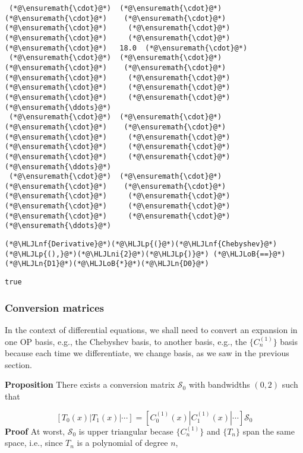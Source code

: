 \documentclass[12pt,landscape]{article}
\newcommand{\HLJLn}[1]{#1}
\newcommand{\HLJLnf}[1]{\textcolor[RGB]{66,102,213}{#1}}
\newcommand{\HLJLni}[1]{\textcolor[RGB]{59,151,46}{#1}}
\newcommand{\HLJLoB}[1]{\textcolor[RGB]{102,102,102}{\textbf{#1}}}
\newcommand{\HLJLp}[1]{#1}
\begin{document}
{\begin{lstlisting}
 (*@\ensuremath{\cdot}@*)  (*@\ensuremath{\cdot}@*)   (*@\ensuremath{\cdot}@*)    (*@\ensuremath{\cdot}@*)    (*@\ensuremath{\cdot}@*)     (*@\ensuremath{\cdot}@*)     (*@\ensuremath{\cdot}@*)     (*@\ensuremath{\cdot}@*)     (*@\ensuremath{\cdot}@*)   18.0  (*@\ensuremath{\cdot}@*)
 (*@\ensuremath{\cdot}@*)  (*@\ensuremath{\cdot}@*)   (*@\ensuremath{\cdot}@*)    (*@\ensuremath{\cdot}@*)    (*@\ensuremath{\cdot}@*)     (*@\ensuremath{\cdot}@*)     (*@\ensuremath{\cdot}@*)     (*@\ensuremath{\cdot}@*)     (*@\ensuremath{\cdot}@*)     (*@\ensuremath{\cdot}@*)   (*@\ensuremath{\ddots}@*)
 (*@\ensuremath{\cdot}@*)  (*@\ensuremath{\cdot}@*)   (*@\ensuremath{\cdot}@*)    (*@\ensuremath{\cdot}@*)    (*@\ensuremath{\cdot}@*)     (*@\ensuremath{\cdot}@*)     (*@\ensuremath{\cdot}@*)     (*@\ensuremath{\cdot}@*)     (*@\ensuremath{\cdot}@*)     (*@\ensuremath{\cdot}@*)   (*@\ensuremath{\ddots}@*)
 (*@\ensuremath{\cdot}@*)  (*@\ensuremath{\cdot}@*)   (*@\ensuremath{\cdot}@*)    (*@\ensuremath{\cdot}@*)    (*@\ensuremath{\cdot}@*)     (*@\ensuremath{\cdot}@*)     (*@\ensuremath{\cdot}@*)     (*@\ensuremath{\cdot}@*)     (*@\ensuremath{\cdot}@*)     (*@\ensuremath{\cdot}@*)   (*@\ensuremath{\ddots}@*)
\end{lstlisting}


\begin{lstlisting}
(*@\HLJLnf{Derivative}@*)(*@\HLJLp{(}@*)(*@\HLJLnf{Chebyshev}@*)(*@\HLJLp{(),}@*)(*@\HLJLni{2}@*)(*@\HLJLp{)}@*) (*@\HLJLoB{==}@*) (*@\HLJLn{D1}@*)(*@\HLJLoB{*}@*)(*@\HLJLn{D0}@*)
\end{lstlisting}

\begin{lstlisting}
true
\end{lstlisting}


\subsubsection{Conversion matrices}
In the context of differential equations, we shall need to convert an expansion in one OP basis, e.g., the Chebyshev basis, to another basis, e.g., the $\{ C_n^{(1)}\}$ basis because each time we differentiate, we change basis, as we saw in the previous section.

\textbf{Proposition} There exists a conversion matrix $\mathcal{S}_0$ with bandwidths $(0,2)$ such that

\[
\left[ T_0(x) | T_1(x) | \cdots  \right] =  \left[ C^{(1)}_0(x) | C^{(1)}_1(x) | \cdots  \right]\mathcal{S}_0
\]
\textbf{Proof} At worst, $\mathcal{S}_0$ is upper triangular becase  $\{ C_n^{(1)}\}$ and $\{ T_n\}$ span the same space, i.e., since $T_n$ is a polynomial of degree $n$,

}
\end{document}
